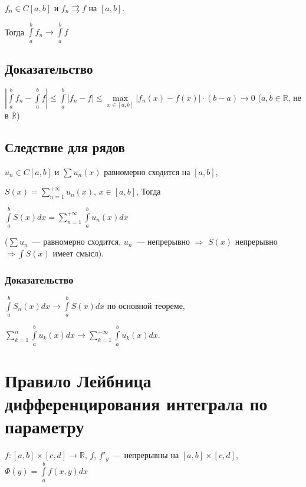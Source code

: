 \documentclass{article}
\begin{document}
        $f_n \in C[a, b]$ и $f_n \rightrightarrows f$ на $[a, b]$.
        
        Тогда $\int\limits^b_a f_n \rightarrow \int\limits^b_a f$
        
        \subsection{Доказательство}
        
            $\left| \int\limits^b_a f_n - \int\limits^b_a f \right| \leqslant \int\limits^b_a | f_n - f | \leqslant \max\limits_{x \in [a, b]} | f_n(x) - f(x) | \cdot (b - a) \rightarrow 0$ ($a, b \in \mathbb{R}$, не в $\overline{\mathbb{R}}$)
            
        \subsection{Следствие для рядов}
        
            $u_n \in C[a, b]$ и $\sum u_n(x)$ равномерно сходится на $[a, b]$,
            
            $S(x) = \sum\limits^{+\infty}_{n = 1} u_n(x)$, $x \in [a, b]$, Тогда 
            
            $\int\limits^b_a S(x) dx = \sum\limits^{+\infty}_{n = 1} \int\limits^b_a u_n(x) dx$
            
            ($\sum u_n$~--- равномерно сходится, $u_n$~--- непрерывно $\Rightarrow$ $S(x)$ непрерывно $\Rightarrow \int S(x)$ имеет смысл).
            
            \subsubsection{Доказательство}
            
                $\int\limits^b_a S_n(x)dx \rightarrow \int\limits^b_a S(x)dx$ по основной теореме,
                
                $\sum\limits^n_{k = 1} \int\limits^b_a u_k(x)dx \rightarrow \sum\limits^{+\infty}_{k = 1} \int\limits^b_a u_k(x)dx$.
                
    \newpage
    
    \section{Правило Лейбница дифференцирования интеграла по параметру}
    
        $f : [a, b] \times [c, d] \rightarrow \mathbb{R}$, $f$, $f'_y$~--- непрерывны на $[a, b] \times [c, d]$, $\Phi(y) = \int\limits^b_a f(x, y) dx$
            
\end{document}
